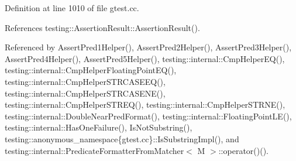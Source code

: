 Definition at line 1010 of file gtest.\+cc.



References testing\+::\+Assertion\+Result\+::\+Assertion\+Result().



Referenced by Assert\+Pred1\+Helper(), Assert\+Pred2\+Helper(), Assert\+Pred3\+Helper(), Assert\+Pred4\+Helper(), Assert\+Pred5\+Helper(), testing\+::internal\+::\+Cmp\+Helper\+E\+Q(), testing\+::internal\+::\+Cmp\+Helper\+Floating\+Point\+E\+Q(), testing\+::internal\+::\+Cmp\+Helper\+S\+T\+R\+C\+A\+S\+E\+E\+Q(), testing\+::internal\+::\+Cmp\+Helper\+S\+T\+R\+C\+A\+S\+E\+N\+E(), testing\+::internal\+::\+Cmp\+Helper\+S\+T\+R\+E\+Q(), testing\+::internal\+::\+Cmp\+Helper\+S\+T\+R\+N\+E(), testing\+::internal\+::\+Double\+Near\+Pred\+Format(), testing\+::internal\+::\+Floating\+Point\+L\+E(), testing\+::internal\+::\+Has\+One\+Failure(), Is\+Not\+Substring(), testing\+::anonymous\+\_\+namespace\{gtest.\+cc\}\+::\+Is\+Substring\+Impl(), and testing\+::internal\+::\+Predicate\+Formatter\+From\+Matcher$<$ M $>$\+::operator()().


